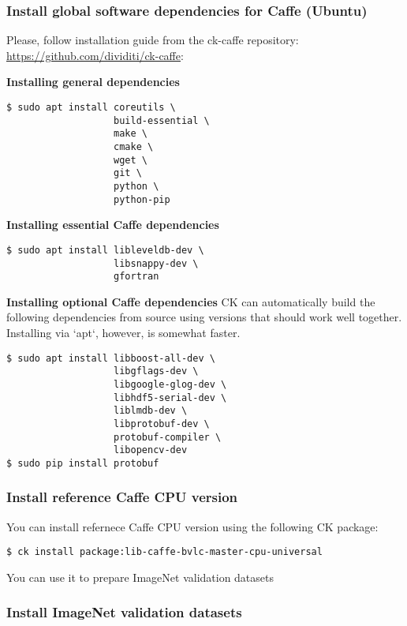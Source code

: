 \documentclass[sigplan]{acmart}
\begin{document}
\subsubsection{Install global software dependencies for Caffe (Ubuntu)}

Please, follow installation guide from the ck-caffe repository: \url{https://github.com/dividiti/ck-caffe}:

\textbf{Installing general dependencies}

\begin{verbatim}
$ sudo apt install coreutils \
                   build-essential \
                   make \
                   cmake \
                   wget \
                   git \
                   python \
                   python-pip
\end{verbatim}

\textbf{Installing essential Caffe dependencies}
\begin{verbatim}
$ sudo apt install libleveldb-dev \
                   libsnappy-dev \
                   gfortran
\end{verbatim}

\textbf{Installing optional Caffe dependencies}
CK can automatically build the following dependencies from source using versions that should work well together. Installing via `apt`, however, is somewhat faster.

\begin{verbatim}
$ sudo apt install libboost-all-dev \
                   libgflags-dev \
                   libgoogle-glog-dev \
                   libhdf5-serial-dev \
                   liblmdb-dev \
                   libprotobuf-dev \
                   protobuf-compiler \
                   libopencv-dev
$ sudo pip install protobuf
\end{verbatim}

\subsubsection{Install reference Caffe CPU version}

You can install refernece Caffe CPU version using the following CK package:
\begin{verbatim}
$ ck install package:lib-caffe-bvlc-master-cpu-universal
\end{verbatim}

You can use it to prepare ImageNet validation datasets

\subsubsection{Install ImageNet validation datasets}
\end{document}
